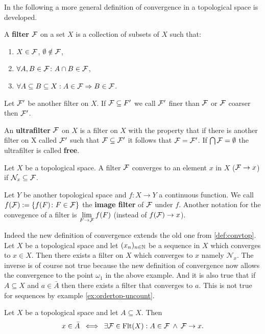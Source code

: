 In the following a more general definition of convergence in a topological space is developed.
\begin{defin}
  A \textbf{filter} $\mathcal{F}$ on a set $X$ is a collection of subsets of $X$ such that:
  \begin{enumerate}
    \item $X \in \mathcal{F}$, $\emptyset \notin \mathcal{F}$,
    \item $\forall A, B \in \mathcal{F}\colon A\cap B \in \mathcal{F}$,
    \item $\forall A \subseteq B \subseteq X: A \in \mathcal{F} \Rightarrow B \in \mathcal{F}$.
  \end{enumerate}
  Let $\mathcal{F}'$ be another filter on $X$. If $\mathcal{F} \subseteq F'$ we call $\mathcal{F}'$ finer than $\mathcal{F}$ or $\mathcal{F}$ coarser then $\mathcal{F}'$.
\end{defin}

\begin{defin} 
  An \textbf{ultrafilter} $\mathcal{F}$ on $X$ is a filter on $X$ with the property that if there is another filter on X called $\mathcal{F}'$ such that $\mathcal{F} \subseteq \mathcal{F}'$ it follows that $\mathcal{F} = \mathcal{F}'$.
  If $\bigcap \mathcal{F} = \emptyset$ the ultrafilter is called \textbf{free}.
\end{defin}

\begin{defin}
  Let $X$ be a topological space. A filter $\mathcal{F}$ converges to an element $x$ in $X$ ($\mathcal{F} \to x$) if $\mathcal{N}_x \subseteq \mathcal{F}$. 
  
  Let $Y$ be another topological space and $f: X \to Y$ a continuous function. 
  We call $f(\mathcal{F}) := \{f(F)\colon F \in \mathcal{F}\}$ the \textbf{image filter} of $\mathcal{F}$ under $f$. Another notation for the convegence of a filter is $\lim\limits_{F\to\mathcal{F}}f(F)$ (instead of $f(\mathcal{F}) \to x$).
\end{defin}

Indeed the new definition of convergence extends the old one from \ref{def:convtop}. Let $X$ be a topological space and let $(x_n)_{n\in\mathbb{N}}$ be a sequence in $X$ which converges to $x \in X$. Then there exists a filter on $X$ which converges to $x$ namely $\mathcal{N}_x$. The inverse is of course not true because the new definition of convergence now allows the convergence to the point $\omega_1$ in the above example. And it is also true that if $A \subseteq X$ and $a \in \bar{A}$ then there exists a filter that converges to $a$. This is not true for sequences by example \ref{ex:ordertop-uncount}.

\begin{thm}
  Let $X$ be a topological space and let $A \subseteq X$. Then
  \begin{equation*}
    x \in \bar{A} \: \iff \: \exists \mathcal{F} \in {\rm Flt}(X): A \in \mathcal{F} \: \land \: \mathcal{F} \to x.
  \end{equation*}
\end{thm}

